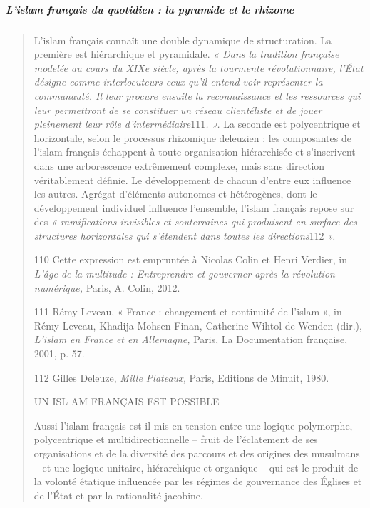 \hypertarget{lislam-franuxe7ais-du-quotidien-la-pyramide-et-le-rhizome}{%
\subparagraph{L'islam français du quotidien : la pyramide et le
rhizome}\label{lislam-franuxe7ais-du-quotidien-la-pyramide-et-le-rhizome}}

\begin{quote}
L'islam français connaît une double dynamique de structuration. La
première est hiérarchique et pyramidale. \emph{« Dans la tradition
française modelée au cours du XIXe siècle, après la tourmente
révolutionnaire, l'État désigne comme interlocuteurs ceux qu'il entend
voir représenter la communauté. Il leur procure ensuite la
reconnaissance et les ressources qui leur permettront de se constituer
un réseau clientéliste et de jouer pleinement leur rôle
d'intermédiaire}111\emph{. ».} La seconde est polycentrique et
horizontale, selon le processus rhizomique deleuzien : les composantes
de l'islam français échappent à toute organisation hiérarchisée et
s'inscrivent dans une arborescence extrêmement complexe, mais sans
direction véritablement définie. Le développement de chacun d'entre eux
influence les autres. Agrégat d'éléments autonomes et hétérogènes, dont
le développement individuel influence l'ensemble, l'islam français
repose sur des \emph{« ramifications invisibles et souterraines qui
produisent en surface des structures horizontales qui s'étendent dans
toutes les directions}112 \emph{».}

110 Cette expression est empruntée à Nicolas Colin et Henri Verdier, in
\emph{L'âge de la multitude : Entreprendre et gouverner après la
révolution numérique,} Paris, A. Colin, 2012.

111 Rémy Leveau, « France : changement et continuité de l'islam », in
Rémy Leveau, Khadija Mohsen-Finan, Catherine Wihtol de Wenden (dir.),
\emph{L'islam en France et en Allemagne,} Paris, La Documentation
française, 2001, p. 57.

112 Gilles Deleuze, \emph{Mille Plateaux,} Paris, Editions de Minuit,
1980.

UN ISL AM FRANÇAIS EST POSSIBLE

Aussi l'islam français est-il mis en tension entre une logique
polymorphe, polycentrique et multidirectionnelle -- fruit de
l'éclatement de ses organisations et de la diversité des parcours et des
origines des musulmans -- et une logique unitaire, hiérarchique et
organique -- qui est le produit de la volonté étatique influencée par
les régimes de gouvernance des Églises et de l'État et par la
rationalité jacobine.


\end{quote}
